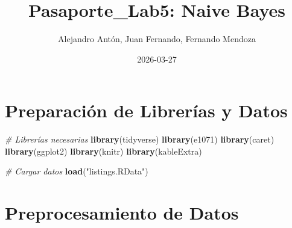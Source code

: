 \documentclass[
]{article}
\title{Pasaporte\_Lab5: Naive Bayes}
\author{Alejandro Antón, Juan Fernando, Fernando Mendoza}
\date{2026-03-27}
\newenvironment{Shaded}{\begin{snugshade}}{\end{snugshade}}
\newcommand{\CommentTok}[1]{\textcolor[rgb]{0.56,0.35,0.01}{\textit{#1}}}
\newcommand{\FunctionTok}[1]{\textcolor[rgb]{0.13,0.29,0.53}{\textbf{#1}}}
\newcommand{\NormalTok}[1]{#1}
\newcommand{\StringTok}[1]{\textcolor[rgb]{0.31,0.60,0.02}{#1}}
\begin{document}
\maketitle

\section{Preparación de Librerías y
Datos}\label{preparaciuxf3n-de-libreruxedas-y-datos}

\begin{Shaded}
\begin{Highlighting}[]
\CommentTok{\# Librerías necesarias}
\FunctionTok{library}\NormalTok{(tidyverse)}
\FunctionTok{library}\NormalTok{(e1071)          }
\FunctionTok{library}\NormalTok{(caret)          }
\FunctionTok{library}\NormalTok{(ggplot2)}
\FunctionTok{library}\NormalTok{(knitr)}
\FunctionTok{library}\NormalTok{(kableExtra)}

\CommentTok{\# Cargar datos}
\FunctionTok{load}\NormalTok{(}\StringTok{"listings.RData"}\NormalTok{)}
\end{Highlighting}
\end{Shaded}

\section{Preprocesamiento de Datos}\label{preprocesamiento-de-datos}
\end{document}
